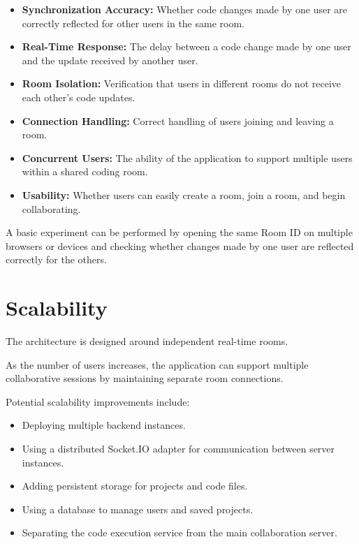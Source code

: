 \documentclass[11pt,letterpaper]{article}
\begin{document}
\begin{itemize}

    \item \textbf{Synchronization Accuracy:} Whether code changes made by one user are correctly reflected for other users in the same room.

    \item \textbf{Real-Time Response:} The delay between a code change made by one user and the update received by another user.

    \item \textbf{Room Isolation:} Verification that users in different rooms do not receive each other's code updates.

    \item \textbf{Connection Handling:} Correct handling of users joining and leaving a room.

    \item \textbf{Concurrent Users:} The ability of the application to support multiple users within a shared coding room.

    \item \textbf{Usability:} Whether users can easily create a room, join a room, and begin collaborating.
    
\end{itemize}

A basic experiment can be performed by opening the same Room ID on multiple browsers or devices and checking whether changes made by one user are reflected correctly for the others.



\section{Scalability}

The architecture is designed around independent real-time rooms.

As the number of users increases, the application can support multiple collaborative sessions by maintaining separate room connections.

Potential scalability improvements include:

\begin{itemize}
    \item Deploying multiple backend instances.
    
    \item Using a distributed Socket.IO adapter for communication between server instances.
    
    \item Adding persistent storage for projects and code files.
    
    \item Using a database to manage users and saved projects.
    
    \item Separating the code execution service from the main collaboration server.
\end{itemize}
\end{document}
